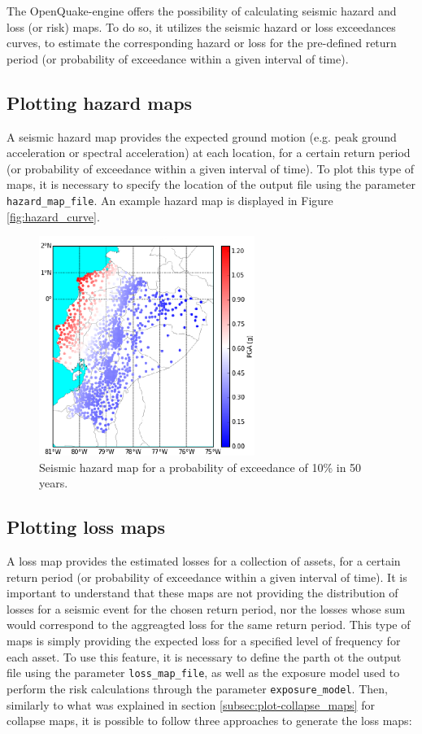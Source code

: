 The OpenQuake-engine offers the possibility of calculating seismic hazard and loss (or risk) maps. To do so, it utilizes the seismic hazard or loss exceedances curves, to estimate the corresponding hazard or loss for the pre-defined return period (or probability of exceedance within a given interval of time).

\subsection{Plotting hazard maps}
\label{subsec:plot-hazard_maps}
A seismic hazard map provides the expected ground motion (e.g. peak ground acceleration or spectral acceleration) at each location, for a certain return period (or probability of exceedance within a given interval of time). To plot this type of maps, it is necessary to specify the location of the output file using the parameter \verb=hazard_map_file=. An example hazard map is displayed in Figure \ref{fig:hazard_curve}.

\begin{figure}[htb]
  \centering
      \includegraphics[width=7cm]{Figures/hazard_Ecuador.eps}
  \caption{Seismic hazard map for a probability of exceedance of 10\% in 50 years.}
  \label{fig:hazard_map}
\end{figure}

\subsection{Plotting loss maps}
\label{subsec:plot-loss_maps}
A loss map provides the estimated losses for a collection of assets, for a certain return period (or probability of exceedance within a given interval of time). It is important to understand that these maps are not providing the distribution of losses for a seismic event for the chosen return period, nor the losses whose sum would correspond to the aggreagted loss for the same return period. This type of maps is simply providing the expected loss for a specified level of frequency for each asset. 
To use this feature, it is necessary to define the parth ot the output file using the parameter \verb=loss_map_file=, as well as the exposure model used to perform the risk calculations through the parameter \verb=exposure_model=. Then, similarly to what was explained in section \ref{subsec:plot-collapse_maps} for collapse maps, it is possible to follow three approaches to generate the loss maps:\\ 

